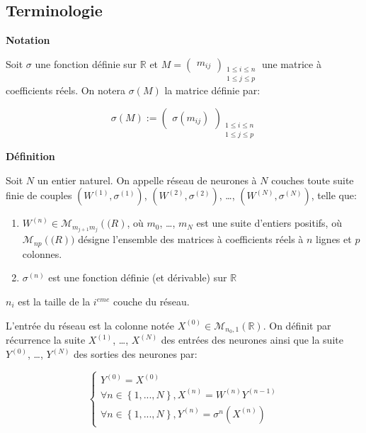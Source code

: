 \documentclass[11pt]{article}
\begin{document}
\subsection{Terminologie}
\label{sec-5-1}

\textbf{Notation}

Soit $\sigma$ une fonction définie sur $\mathbb{R}$ et
$M=\begin{pmatrix}m_{ij}
\end{pmatrix}_{\substack{1\leq i\leq n\\1\leq j\leq p }}$ une matrice à
coefficients réels. On notera $\sigma(M)$ la matrice définie par:

\begin{equation}
\sigma(M):=\begin{pmatrix}
\sigma(m_{ij})
\end{pmatrix}_{\substack{1\leq i\leq n\\1\leq j\leq p }}
\end{equation}

\textbf{Définition}

Soit $N$ un entier naturel. On appelle réseau de neurones à $N$ couches toute
suite finie de couples $(W^{(1)},\sigma^{(1)})$, $(W^{(2)},\sigma^{(2)})$, \ldots{},
$(W^{(N)},\sigma^{(N)})$, telle que:

\begin{enumerate}
\item $W^{(n)}\in\mathcal{M}_{m_{j+1}m_{j}}(\mathbb(R)$, où $m_{0}$, \ldots{}, $m_N$ est
une suite d'entiers positifs, où $\mathcal{M}_{np}(\mathbb(R))$ désigne
l'ensemble des matrices à coefficients réels à $n$ lignes et $p$ colonnes.
\item $\sigma^{(n)}$ est une fonction définie (et dérivable) sur $\mathbb{R}$
\end{enumerate}

$n_{i}$ est la taille de la $i^{eme}$ couche du réseau.

L'entrée du réseau est la colonne notée
$X^{(0)}\in\mathcal{M}_{n_{0},1}(\mathbb{R})$. On définit par récurrence la
suite $X^{(1)}$, \ldots{}, $X^{(N)}$ des entrées des neurones ainsi que la suite
$Y^{(0)}$, \ldots{}, $Y^{(N)}$ des sorties des neurones par:

\begin{equation}
\begin{cases}
Y^{(0)}=X^{(0)}\\
\forall n\in \left\{1,...,N\right\}, X^{(n)}=W^{(n)}Y^{(n-1)}\\
\forall n\in \left\{1,...,N\right\}, Y^{(n)}=\sigma^{n}(X^{(n)})
\end{cases}
\end{equation}
\end{document}
